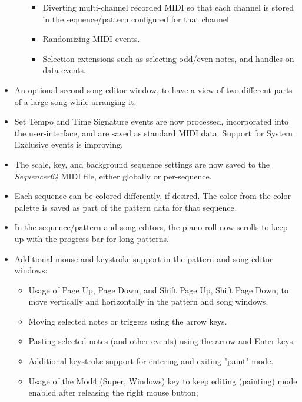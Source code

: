 \documentclass[
 11pt,
 twoside,
 a4paper,
 headinclude,
 footinclude,
 final                                 %
]{article}
\begin{document}
\begin{itemize}
\begin{itemize}
            \begin{itemize}
               \item Diverting multi-channel recorded MIDI so that each channel
                  is stored in the sequence/pattern configured for that channel
               \item Randomizing MIDI events.
               \item Selection extensions such as selecting odd/even notes, and
                  handles on data events.
            \end{itemize}
         \end{itemize}
      \item An optional second song editor window, to have a view
         of two different parts of a large song while arranging it.
      \item Set Tempo and Time Signature events are
         now processed, incorporated into the user-interface, and are saved
         as standard MIDI data.  Support for System Exclusive events is
         improving.
      \item The scale, key, and background sequence
         settings are now saved to the \textsl{Sequencer64} MIDI file, either
         globally or per-sequence.
      \item Each sequence can be colored differently, if desired.  The color
         from the color palette is saved as part of the pattern data for that
         sequence.
      \item In the sequence/pattern and song editors, the piano roll
         now scrolls to keep up with the progress bar for long patterns.
      \item Additional mouse and keystroke support in the pattern and song
         editor windows:
      \begin{itemize}
         \item Usage of Page Up, Page Down, and Shift Page Up, Shift Page Down,
            to move vertically and horizontally in the pattern and song
            windows.
         \item Moving selected notes or triggers using the arrow keys.
         \item Pasting selected notes (and other events) using the arrow and
            Enter keys.
         \item Additional keystroke support for entering and exiting "paint"
            mode.
         \item Usage of the Mod4 (Super, Windows) key to keep editing
            (painting) mode enabled after releasing the right mouse button;

\end{itemize}
\end{itemize}
\end{document}
